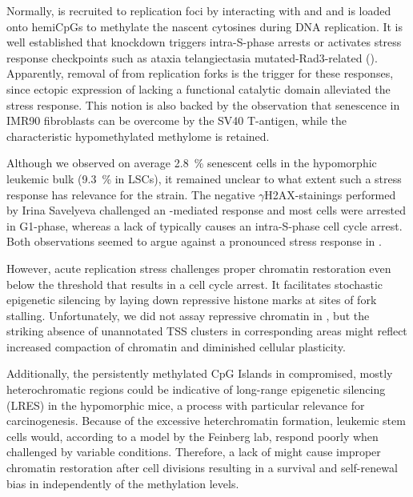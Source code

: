 Normally,  is recruited to replication foci by interacting with   and  \cite{Easwaran2004,Esteve2006} and is loaded onto hemiCpGs to methylate the nascent cytosines during DNA replication. It is well established that  knockdown triggers intra-S-phase arrests\cite{Milutinovic2003} or activates stress response checkpoints such as ataxia telangiectasia mutated-Rad3-related ()\cite{Unterberger2006}. Apparently, removal of  from replication forks is the trigger for these responses, since ectopic expression of  lacking a functional catalytic domain alleviated the stress response\cite{Unterberger2006}. This notion is also backed by the observation that senescence in IMR90 fibroblasts can be overcome by the SV40 T-antigen, while the characteristic hypomethylated methylome is retained\cite{Cruickshanks2013}.  

Although we observed on average \SI{2.8}{\percent} senescent cells in the hypomorphic leukemic bulk (\SI{9.3}{\percent} in LSCs), it remained unclear to what extent such a stress response has relevance for the \dnmtchip strain. The negative \ensuremath{\gamma}H2AX-stainings performed by Irina Savelyeva challenged an -mediated response and most \dnmtchip cells were arrested in G1-phase\dns, whereas a lack of  typically causes an intra-S-phase cell cycle arrest\cite{Milutinovic2003}. Both observations seemed to argue against a pronounced stress response in \dnmtchip.

However, acute replication stress challenges proper chromatin restoration even below the threshold that results in a cell cycle arrest. It facilitates stochastic epigenetic silencing by laying down repressive histone marks at sites of fork stalling\cite{Jasencakova2010a}. Unfortunately, we did not assay repressive chromatin in \dnmtchip, but the striking absence of unannotated TSS clusters in corresponding areas might reflect increased compaction of chromatin and diminished cellular plasticity. 

Additionally, the persistently methylated CpG Islands in compromised, mostly heterochromatic regions could be indicative of long-range epigenetic silencing (LRES) in the hypomorphic mice, a process with particular relevance for carcinogenesis\cite{Clark2007}. Because of the excessive heterchromatin formation, \dnmtchip \mllafnine leukemic stem cells would, according to a model by the Feinberg lab\cite{Pujadas2012}, respond poorly when challenged by variable conditions. Therefore, a lack of  might cause improper chromatin restoration after cell divisions resulting in a survival and self-renewal bias in \dnmtchip independently of the methylation levels.

